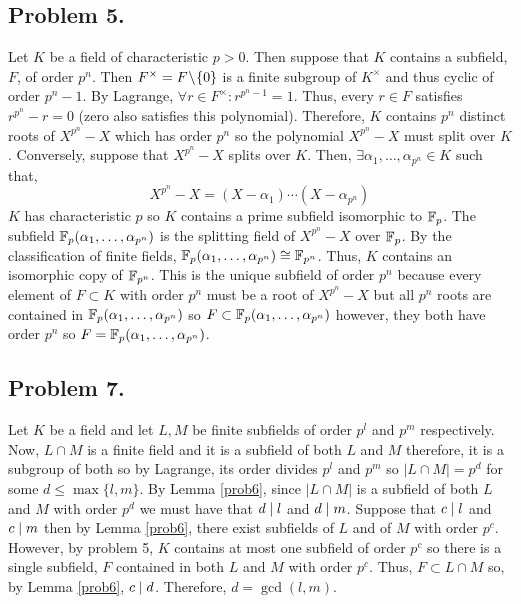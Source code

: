 \documentclass[12pt]{extarticle}
\begin{document}
\subsection*{Problem 5.}
Let $K$ be a field of characteristic $p > 0$. Then suppose that $K$ contains a subfield, $F$, of order $p^n$. Then $F^\times = F \! \setminus \! \{0 \}$ is a finite subgroup of $K^\times$ and thus cyclic of order $p^n - 1$. By Lagrange, $\forall r \in F^\times : r^{p^n - 1} = 1$. Thus, every $r \in F$ satisfies $r^{p^n} - r = 0$ (zero also satisfies this polynomial). Therefore, $K$ contains $p^n$ distinct roots of $X^{p^n} - X$ which has order $p^n$ so the polynomial $X^{p^n} - X$ must split over $K$. Conversely, suppose that $X^{p^n} - X$ splits over $K$. Then, $\exists \alpha_1, \dots, \alpha_{p^n} \in K$ such that,
\[ X^{p^n} - X = (X - \alpha_1) \cdots (X - \alpha_{p^n})\]  
$K$ has characteristic $p$ so $K$ contains a prime subfield isomorphic to $\mathbb{F}_{p}$. The subfield $\mathbb{F}_{p}(\alpha_1, \dots, \alpha_{p^n})$ is the splitting field of $X^{p^n} - X$ over $\mathbb{F}_{p}$. By the classification of finite fields, $\mathbb{F}_{p}(\alpha_1, \dots, \alpha_{p^n}) \cong \mathbb{F}_{p^n}$. Thus, $K$ contains an isomorphic copy of $\mathbb{F}_{p^n}$. This is the unique subfield of order $p^n$ because every element of $F \subset K$ with order $p^n$ must be a root of $X^{p^n} - X$ but all $p^n$ roots are contained in $\mathbb{F}_{p}(\alpha_1, \dots, \alpha_{p^n})$ so $F \subset \mathbb{F}_{p}(\alpha_1, \dots, \alpha_{p^n})$ however, they both have order $p^n$ so $F = \mathbb{F}_{p}(\alpha_1, \dots, \alpha_{p^n})$.   

\subsection*{Problem 7.}
Let $K$ be a field and let $L, M$ be finite subfields of order $p^l$ and $p^m$ respectively.  Now, $L \cap M$ is a finite field and it is a subfield of both $L$ and $M$ therefore, it is a subgroup of both so by Lagrange, its order divides $p^l$ and $p^m$ so $|L \cap M| = p^d$ for some $d \le \max\{l, m\}$. By Lemma \ref{prob6}, since $|L \cap M|$ is a subfield of both $L$ and $M$ with order $p^d$ we must have that $d \mid l$ and $d \mid m$. Suppose that $c \mid l$ and $c \mid m$ then by Lemma \ref{prob6}, there exist subfields of $L$ and of $M$ with order $p^c$. However, by problem 5, $K$ contains at most one subfield of order $p^c$ so there is a single subfield, $F$ contained in both $L$ and $M$ with order $p^c$. Thus, $F \subset L \cap M$ so, by Lemma \ref{prob6}, $c \mid d$. Therefore, $d = \gcd{(l, m)}$.       
\end{document}
